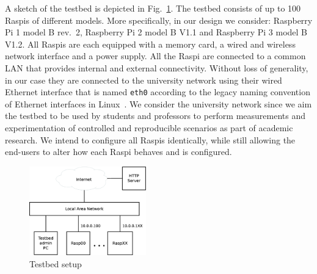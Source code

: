\label{sec:overview}




A sketch of the testbed is depicted in Fig.~\ref{fig:testbed_setup}.
The testbed consists of up to 100 \ac{Raspi}s of different models.
More specifically, in our design we consider: Raspberry Pi 1 model B rev.~2,
Raspberry Pi 2 model B V1.1 and Raspberry Pi 3 model B V1.2.
All \ac{Raspi}s are each equipped with a memory card, a wired and wireless
network interface and a power supply. All the \ac{Raspi} are connected to a common
\ac{LAN} that provides internal and external connectivity. Without loss of generality,
in our case they are connected to the university network using their wired Ethernet interface
that is named \texttt{eth0} according to the legacy naming convention of Ethernet
interfaces in Linux~\cite{PredictableNetworkInterfaceNames}. We consider the
university network since we aim the testbed to be used by students and professors
to perform measurements and experimentation of controlled and reproducible scenarios
as part of academic research. We intend to configure all \ac{Raspi}s identically,
while still allowing the end-users to alter how each \ac{Raspi} behaves and is configured.

\begin{figure}[ht!]
\centering
\includegraphics[width=0.45\textwidth]{images/testbed_setup3.eps}
\caption{Testbed setup}
\label{fig:testbed_setup}
\end{figure}

